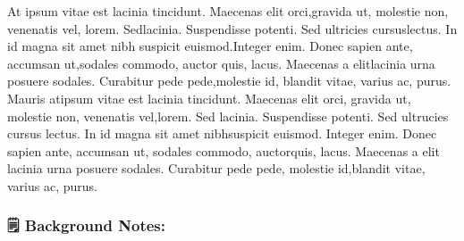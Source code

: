 \documentclass[11pt]{article}
\begin{document}
At ipsum vitae est lacinia tincidunt. Maecenas elit orci,gravida ut, molestie non, venenatis vel, lorem. Sedlacinia. Suspendisse potenti. Sed ultricies cursuslectus. In id magna sit amet nibh suspicit euismod.Integer enim. Donec sapien ante, accumsan ut,sodales commodo, auctor quis, lacus. Maecenas a elitlacinia urna posuere sodales. Curabitur pede pede,molestie id, blandit vitae, varius ac, purus. Mauris atipsum vitae est lacinia tincidunt. Maecenas elit orci, gravida ut, molestie non, venenatis vel,lorem. Sed lacinia. Suspendisse potenti. Sed ultrucies cursus lectus. In id magna sit amet nibhsuspicit euismod. Integer enim. Donec sapien ante, accumsan ut, sodales commodo, auctorquis, lacus. Maecenas a elit lacinia urna posuere sodales. Curabitur pede pede, molestie id,blandit vitae, varius ac, purus.

\subsubsection{🗒 Background Notes:}
\label{sec:orge71537c}
\end{document}
